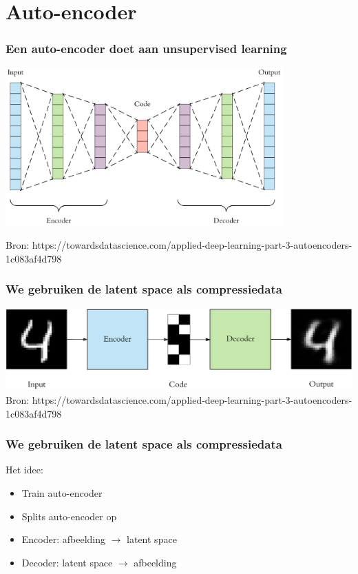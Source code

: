 \documentclass[]{beamer}
\begin{document}
\section{Auto-encoder}
\begin{frame}
	\frametitle{Een auto-encoder doet aan unsupervised learning}
	\centering
	\includegraphics[width = 0.8\textwidth,height = 0.6 \textheight]{autoencoder.png}

	\footnotesize{Bron: https://towardsdatascience.com/applied-deep-learning-part-3-autoencoders-1c083af4d798}
\end{frame}

\begin{frame}
	\frametitle{We gebruiken de latent space als compressiedata}
	\centering
	\includegraphics[width = \textwidth]{blockdiagram.png}
	\footnotesize{Bron: https://towardsdatascience.com/applied-deep-learning-part-3-autoencoders-1c083af4d798}
\end{frame}

\begin{frame}
	\frametitle{We gebruiken de latent space als compressiedata}
	Het idee: \pause
	\begin{itemize}
		\item Train auto-encoder \pause
		\item Splits auto-encoder op \pause
		\item Encoder: afbeelding $\rightarrow$ latent space \pause
		\item Decoder: latent space $\rightarrow$ afbeelding
	\end{itemize}
\end{frame}
\end{document}
